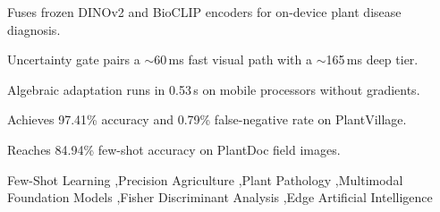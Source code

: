 \begin{frontmatter}
\begin{highlights}
\item Fuses frozen DINOv2 and BioCLIP encoders for on-device plant disease diagnosis.
\item Uncertainty gate pairs a $\sim$60\,ms fast visual path with a $\sim$165\,ms deep tier.
\item Algebraic adaptation runs in 0.53\,s on mobile processors without gradients.
\item Achieves 97.41\% accuracy and 0.79\% false-negative rate on PlantVillage.
\item Reaches 84.94\% few-shot accuracy on PlantDoc field images.
\end{highlights}

\begin{keyword}
Few-Shot Learning \sep Precision Agriculture \sep Plant Pathology \sep Multimodal Foundation Models \sep Fisher Discriminant Analysis \sep Edge Artificial Intelligence
\end{keyword}

\end{frontmatter}
